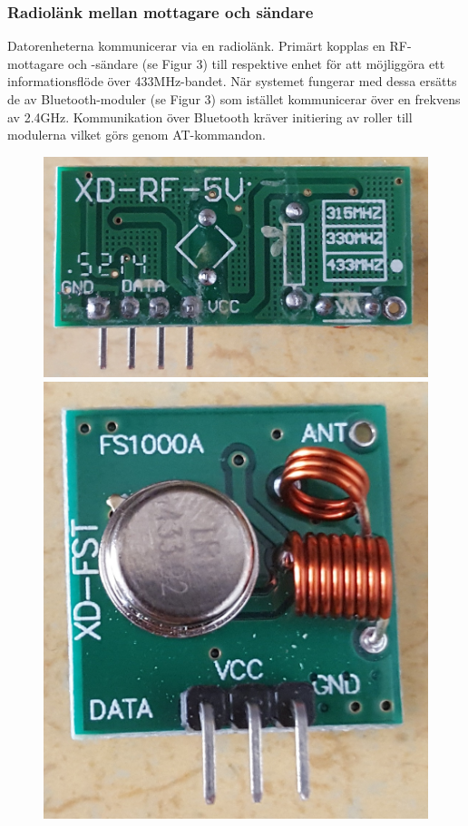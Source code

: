 \documentclass[a4paper]{article}
\begin{document}
\subsubsection{Radiolänk mellan mottagare och sändare}
Datorenheterna kommunicerar via en radiolänk. Primärt kopplas en RF-mottagare och -sändare (se Figur 3) till respektive enhet för att möjliggöra ett informationsflöde över 433MHz-bandet. När systemet fungerar med dessa ersätts de av Bluetooth-moduler (se Figur 3) som istället kommunicerar över en frekvens av 2.4GHz. Kommunikation över Bluetooth kräver initiering av roller till modulerna vilket görs genom AT-kommandon. 



\begin{figure}[H]
\centering
\includegraphics[scale=0.048]{RF-transmitter.jpg}
\includegraphics[scale=0.04]{RF-receiver.jpg} \\ \vspace{2mm}

\end{figure}
\end{document}
